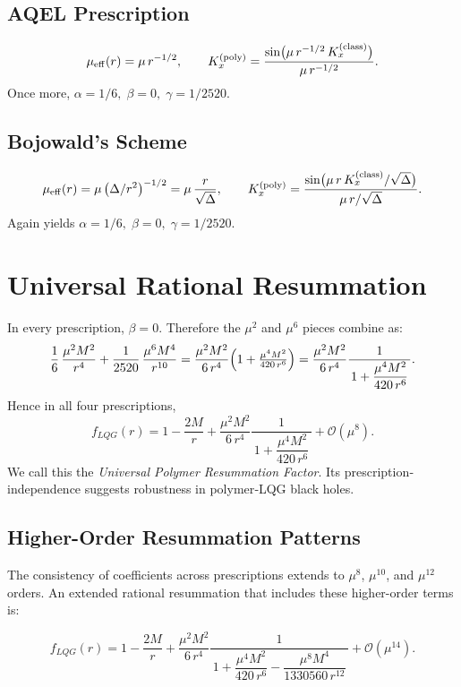 \documentclass[11pt]{article}
\begin{document}
\subsection{AQEL Prescription~\cite{AQEL2008}}

\[
\mu_{\rm eff}(r) = \mu\,r^{-1/2}, 
\qquad
K_x^{(\text{poly})} = \frac{\sin\bigl(\mu\,r^{-1/2}\,K_x^{(\text{class})}\bigr)}{\mu\,r^{-1/2}}.
\]
Once more, 
\(\alpha=1/6,\;\beta=0,\;\gamma=1/2520.\)

\subsection{Bojowald's Scheme~\cite{Bojowald2005}}

\[
\mu_{\rm eff}(r) = \mu\,\bigl(\Delta/r^2\bigr)^{-1/2} 
              = \mu\,\frac{r}{\sqrt{\Delta}}, 
\qquad
K_x^{(\text{poly})} = \frac{\sin\bigl(\mu\,r\,K_x^{(\text{class})}/\sqrt{\Delta}\bigr)}{\mu\,r/\sqrt{\Delta}}.
\]
Again yields \(\alpha=1/6,\;\beta=0,\;\gamma=1/2520.\)

\section{Universal Rational Resummation}

In every prescription, \(\beta=0\).  Therefore the \(\mu^2\) and \(\mu^6\) pieces combine as:
\[
\frac{1}{6}\,\frac{\mu^{2}M^{2}}{r^{4}}
+ \frac{1}{2520}\,\frac{\mu^{6}M^{4}}{r^{10}}
= \frac{\mu^{2}M^{2}}{6\,r^{4}}
  \Bigl(1 + \tfrac{\mu^{4}M^{2}}{420\,r^{6}}\Bigr)
= \frac{\mu^{2}M^{2}}{6\,r^{4}}
  \frac{1}{\,1 + \dfrac{\mu^{4}M^{2}}{420\,r^{6}}\,}.
\]
Hence in all four prescriptions,
\[
f_{LQG}(r)
= 1 - \frac{2M}{r}
+ \frac{\mu^{2}M^{2}}{6\,r^{4}}
  \frac{1}{\,1 + \dfrac{\mu^{4}M^{2}}{420\,r^{6}}\,}
+ \mathcal{O}(\mu^{8}).
\]
We call this the \emph{Universal Polymer Resummation Factor}.  Its prescription‐independence suggests robustness in polymer‐LQG black holes.

\subsection{Higher-Order Resummation Patterns}

The consistency of coefficients across prescriptions extends to $\mu^{8}$, $\mu^{10}$, and $\mu^{12}$ orders. An extended rational resummation that includes these higher-order terms is:

\begin{equation}
f_{LQG}(r)
= 1 - \frac{2M}{r}
+ \frac{\mu^{2}M^{2}}{6\,r^{4}}
  \frac{1}{\,1 + \dfrac{\mu^{4}M^{2}}{420\,r^{6}} - \dfrac{\mu^{8}M^{4}}{1330560\,r^{12}}\,}
+ \mathcal{O}(\mu^{14}).
\end{equation}
\end{document}
